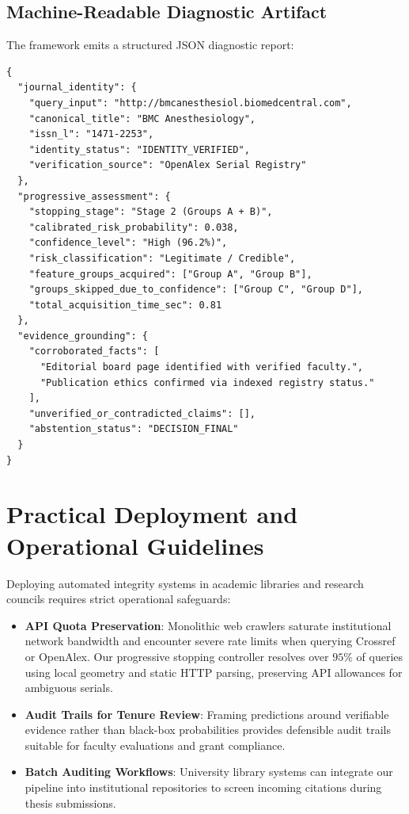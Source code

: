 \documentclass[journal]{IEEEtran}
\begin{document}
\subsection{Machine-Readable Diagnostic Artifact}
The framework emits a structured JSON diagnostic report:
\begin{verbatim}
{
  "journal_identity": {
    "query_input": "http://bmcanesthesiol.biomedcentral.com",
    "canonical_title": "BMC Anesthesiology",
    "issn_l": "1471-2253",
    "identity_status": "IDENTITY_VERIFIED",
    "verification_source": "OpenAlex Serial Registry"
  },
  "progressive_assessment": {
    "stopping_stage": "Stage 2 (Groups A + B)",
    "calibrated_risk_probability": 0.038,
    "confidence_level": "High (96.2%)",
    "risk_classification": "Legitimate / Credible",
    "feature_groups_acquired": ["Group A", "Group B"],
    "groups_skipped_due_to_confidence": ["Group C", "Group D"],
    "total_acquisition_time_sec": 0.81
  },
  "evidence_grounding": {
    "corroborated_facts": [
      "Editorial board page identified with verified faculty.",
      "Publication ethics confirmed via indexed registry status."
    ],
    "unverified_or_contradicted_claims": [],
    "abstention_status": "DECISION_FINAL"
  }
}
\end{verbatim}

\section{Practical Deployment and Operational Guidelines}
Deploying automated integrity systems in academic libraries and research councils requires strict operational safeguards:
\begin{itemize}
    \item \textbf{API Quota Preservation}: Monolithic web crawlers saturate institutional network bandwidth and encounter severe rate limits when querying Crossref or OpenAlex. Our progressive stopping controller resolves over $95\%$ of queries using local geometry and static HTTP parsing, preserving API allowances for ambiguous serials.
    \item \textbf{Audit Trails for Tenure Review}: Framing predictions around verifiable evidence rather than black-box probabilities provides defensible audit trails suitable for faculty evaluations and grant compliance.
    \item \textbf{Batch Auditing Workflows}: University library systems can integrate our pipeline into institutional repositories to screen incoming citations during thesis submissions.
\end{itemize}
\end{document}
